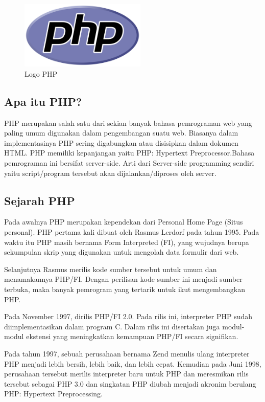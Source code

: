 	\begin{figure}[H]
		\includegraphics[width=6cm]{figures/web/php.png}
		\centering
		\caption{Logo PHP}
	\end{figure}


\subsection{Apa itu PHP?}
PHP merupakan salah satu dari sekian banyak bahasa pemrograman web yang paling umum digunakan dalam pengembangan suatu web. Biasanya dalam implementasinya PHP sering digabungkan atau disisipkan dalam dokumen HTML. PHP memiliki kepanjangan yaitu PHP: Hypertext Preprocessor.Bahasa pemrograman ini bersifat server-side. Arti dari Server-side programming sendiri yaitu script/program tersebut akan dijalankan/diproses oleh server. 

\subsection{Sejarah PHP}
Pada awalnya PHP merupakan kependekan dari Personal Home Page (Situs personal). PHP pertama kali dibuat oleh Rasmus Lerdorf pada tahun 1995. Pada waktu itu PHP masih bernama Form Interpreted (FI), yang wujudnya berupa sekumpulan skrip yang digunakan untuk mengolah data formulir dari web.

Selanjutnya Rasmus merilis kode sumber tersebut untuk umum dan menamakannya PHP/FI. Dengan perilisan kode sumber ini menjadi sumber terbuka, maka banyak pemrogram yang tertarik untuk ikut mengembangkan PHP.

Pada November 1997, dirilis PHP/FI 2.0. Pada rilis ini, interpreter PHP sudah diimplementasikan dalam program C. Dalam rilis ini disertakan juga modul-modul ekstensi yang meningkatkan kemampuan PHP/FI secara signifikan.

Pada tahun 1997, sebuah perusahaan bernama Zend menulis ulang interpreter PHP menjadi lebih bersih, lebih baik, dan lebih cepat. Kemudian pada Juni 1998, perusahaan tersebut merilis interpreter baru untuk PHP dan meresmikan rilis tersebut sebagai PHP 3.0 dan singkatan PHP diubah menjadi akronim berulang PHP: Hypertext Preprocessing.

